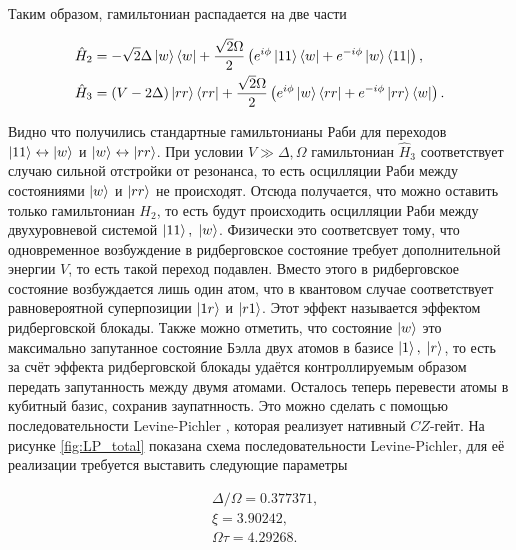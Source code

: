 Таким образом, гамильтониан распадается на две части

\begin{equation}
	\begin{aligned}
		& \hat{H}_{2} = -\sqrt{2}\Delta \left| w \right\rangle\left\langle w \right| + \frac{\sqrt{2}\Omega}{2}\left(e^{i\phi}\left| 11 \right\rangle\left\langle w \right| +e^{-i\phi}\left| w \right\rangle\left\langle 11 \right| \right), \\
		& \hat{H}_{3} = (V-2\Delta)\left| rr \right\rangle\left\langle rr \right| + \frac{\sqrt{2}\Omega}{2}\left(e^{i\phi}\left| w \right\rangle\left\langle rr \right| +e^{-i\phi}\left| rr \right\rangle\left\langle w \right| \right).
	\end{aligned}
\end{equation}

Видно что получились стандартные гамильтонианы Раби для переходов $\left| 11 \right\rangle \leftrightarrow \left| w \right\rangle$ и $\left| w \right\rangle \leftrightarrow \left| rr \right\rangle$. При условии $V \gg \Delta, \Omega$ гамильтониан $\hat{H}_3$ соответствует случаю сильной отстройки от резонанса, то есть осцилляции Раби между состояниями $\left| w \right\rangle$ и $\left| rr \right\rangle$ не происходят. Отсюда получается, что можно оставить только гамильтониан $H_2$, то есть будут происходить осцилляции Раби между двухуровневой системой $\left| 11 \right\rangle, \; \left| w \right\rangle$. Физически это соответсвует тому, что одновременное возбуждение в ридберговское состояние требует дополнительной энергии $V$, то есть такой переход подавлен. Вместо этого в ридберговское состояние возбуждается лишь один атом, что в квантовом случае соответствует равновероятной суперпозиции $\left| 1r \right\rangle$ и $\left| r1 \right\rangle$. Этот эффект называется эффектом ридберговской блокады. Также можно отметить, что состояние $\left| w \right\rangle$ это максимально запутанное состояние Бэлла двух атомов в базисе $\left| 1 \right\rangle, \; \left| r \right\rangle$, то есть за счёт эффекта ридберговской блокады удаётся контроллируемым образом передать запутанность между двумя атомами. Осталось теперь перевести атомы в кубитный базис, сохранив заупатнность. Это можно сделать с помощью последовательности Levine-Pichler \cite{toffoli}, которая реализует нативный $CZ$-гейт. На рисунке \ref{fig:LP_total} показана схема последовательности Levine-Pichler, для её реализации требуется выставить следующие параметры \cite{toffoli}

\begin{equation}
	\begin{aligned}
		& \Delta/\Omega = 0.377371, \\
		& \xi = 3.90242, \\
		& \Omega \tau = 4.29268.
	\end{aligned}
\end{equation}

